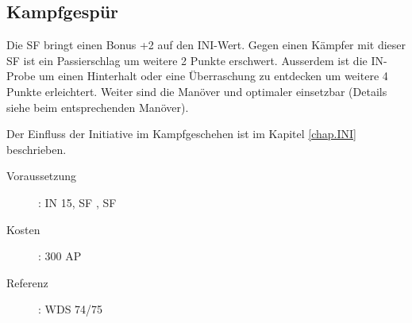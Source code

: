 \subsection{Kampfgespür}
\label{sf.kampfgespuer}
Die SF  bringt einen Bonus +2 auf den INI-Wert.
Gegen einen Kämpfer mit dieser SF ist ein Passierschlag um weitere 2 Punkte erschwert.
Ausserdem ist die IN-Probe um einen Hinterhalt oder eine Überraschung zu entdecken um weitere 4 Punkte erleichtert.
Weiter sind die Manöver  und  optimaler einsetzbar (Details siehe beim entsprechenden Manöver).

Der Einfluss der Initiative im Kampfgeschehen ist im Kapitel \ref{chap.INI} beschrieben.
\begin{description}
    \item[Voraussetzung]:
        IN 15, SF , SF 
    \item [Kosten]:
        300 AP
    \item [Referenz]:
        WDS 74/75
\end{description}
